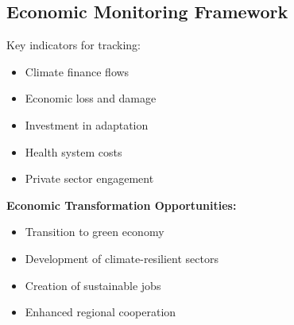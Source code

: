\subsection{Economic Monitoring Framework}
Key indicators for tracking:

\begin{itemize}
    \item Climate finance flows
    \item Economic loss and damage
    \item Investment in adaptation
    \item Health system costs
    \item Private sector engagement
\end{itemize}

\begin{keymessage}
\textbf{Economic Transformation Opportunities:}
\begin{itemize}
    \item Transition to green economy
    \item Development of climate-resilient sectors
    \item Creation of sustainable jobs
    \item Enhanced regional cooperation
\end{itemize}
\end{keymessage}
